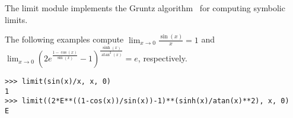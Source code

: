 The limit module implements the Gruntz algorithm~\cite{Gruntz1996limits} for
computing symbolic limits.

The following examples compute $\lim_{x\to 0} \frac{\sin(x)}{x}=1$ and
$\lim_{x\to 0}\left(2 e^{\frac{1 - \cos{\left (x \right )}}{\sin{\left (x \right )}}} -
  1\right)^{\frac{\sinh{\left (x \right )}}{\operatorname{atan}^{2}{\left (x
      \right )}}} = e$, respectively.

\begin{verbatim}
>>> limit(sin(x)/x, x, 0)
1
>>> limit((2*E**((1-cos(x))/sin(x))-1)**(sinh(x)/atan(x)**2), x, 0)
E
\end{verbatim}
